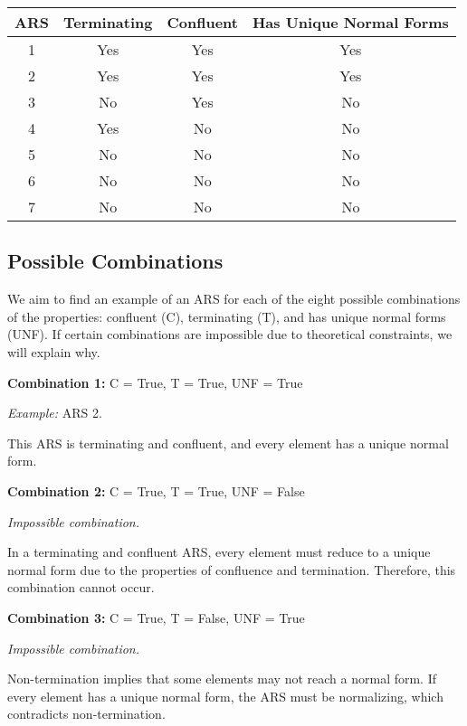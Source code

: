 \documentclass{article}
\theoremstyle{theorem}
\theoremstyle{definition}
\theoremstyle{remark}
\begin{document}
\begin{center}
\begin{tabular}{|c|c|c|c|}
\hline
ARS & Terminating & Confluent & Has Unique Normal Forms \\
\hline
1 & Yes & Yes & Yes \\
2 & Yes & Yes & Yes \\
3 & No & Yes & No \\
4 & Yes & No & No \\
5 & No & No & No \\
6 & No & No & No \\
7 & No & No & No \\
\hline
\end{tabular}
\end{center}

\subsection*{Possible Combinations}

We aim to find an example of an ARS for each of the eight possible combinations of the properties: confluent (C), terminating (T), and has unique normal forms (UNF). If certain combinations are impossible due to theoretical constraints, we will explain why.

\bigskip

\textbf{Combination 1:} C = True, T = True, UNF = True

\emph{Example:} ARS 2.

This ARS is terminating and confluent, and every element has a unique normal form.

\bigskip

\textbf{Combination 2:} C = True, T = True, UNF = False

\emph{Impossible combination.}

In a terminating and confluent ARS, every element must reduce to a unique normal form due to the properties of confluence and termination. Therefore, this combination cannot occur.

\bigskip

\textbf{Combination 3:} C = True, T = False, UNF = True

\emph{Impossible combination.}

Non-termination implies that some elements may not reach a normal form. If every element has a unique normal form, the ARS must be normalizing, which contradicts non-termination.

\bigskip
\end{document}

